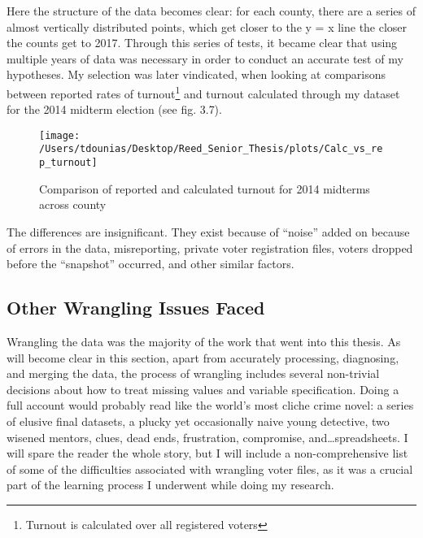 \documentclass[12pt,twoside]{reedthesis}
\begin{document}
  Here the structure of the data becomes clear: for each county, there are
  a series of almost vertically distributed points, which get closer to
  the y = x line the closer the counts get to 2017. Through this series of
  tests, it became clear that using multiple years of data was necessary
  in order to conduct an accurate test of my hypotheses. My selection was
  later vindicated, when looking at comparisons between reported rates of
  turnout\footnote{Turnout is calculated over all registered voters} and
  turnout calculated through my dataset for the 2014 midterm election (see
  fig. 3.7).
  
  \begin{figure}
  
  {\centering \texttt{[image: /Users/tdounias/Desktop/Reed\_Senior\_Thesis/plots/Calc\_vs\_rep\_turnout]} 
  
  }
  
  \caption[Comparison of reported and calculated turnout for 2014 midterms across county]{Comparison of reported and calculated turnout for 2014 midterms across county}\label{fig:comp turnout 2014}
  \end{figure}
  
  The differences are insignificant. They exist because of ``noise'' added
  on because of errors in the data, misreporting, private voter
  registration files, voters dropped before the ``snapshot'' occurred, and
  other similar factors.
  
  \subsection{Other Wrangling Issues
  Faced}\label{other-wrangling-issues-faced}
  
  Wrangling the data was the majority of the work that went into this
  thesis. As will become clear in this section, apart from accurately
  processing, diagnosing, and merging the data, the process of wrangling
  includes several non-trivial decisions about how to treat missing values
  and variable specification. Doing a full account would probably read
  like the world's most cliche crime novel: a series of elusive final
  datasets, a plucky yet occasionally naive young detective, two wisened
  mentors, clues, dead ends, frustration, compromise,
  and\ldots{}spreadsheets. I will spare the reader the whole story, but I
  will include a non-comprehensive list of some of the difficulties
  associated with wrangling voter files, as it was a crucial part of the
  learning process I underwent while doing my research.
  
\end{document}
